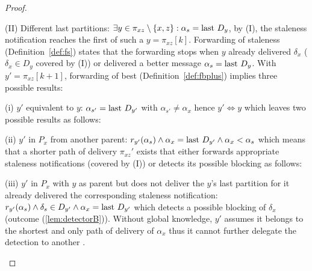 \begin{proof}
\begin{asparadesc}
  \item[(II) Different last partitions:] $\exists y \in \pi_{xz}
    \setminus \{x, z\}: \alpha_s = \textup{last}~ D_y$, by (I), the staleness
    notification reaches the first of such a \process $y =
    \pi_{xz}[k]$.  Forwarding of staleness (Definition~\ref{def:fs})
    states that the forwarding stops when $y$ already delivered
    $\delta_x$ ($\delta_x \in D_y$ covered by (I)) or delivered a
    better message $\alpha_s = \textup{last}~ D_y$.  With $y'=\pi_{xz}[k+1]$,
    forwarding of best (Definition~\ref{def:fbplus}) implies three
    possible results:
  \begin{asparadesc}
  \item [(i) $y'$ equivalent to $y$:] $\alpha_{s'} = \textup{last}~ D_{y'}$
    with $\alpha_{s'} \neq \alpha_x$ hence $y' \iff y$ which leaves
    two possible results as follows:
  \item [(ii) $y'$ in $P_x$ from another parent:] $r_{y'}(\alpha_s)
    \wedge \alpha_x = \textup{last}~ D_{y'} \wedge \alpha_x < \alpha_s$ which
    means that a shorter path of delivery $\pi_{xz}'$ exists that
    either forwards appropriate staleness notifications (covered by
    (I)) or detects its possible blocking as follows:
  \item [(iii) $y'$ in $P_x$ with $y$ as parent] but does not deliver
    the $y$'s last partition for it already delivered the
    corresponding staleness notification: $r_{y'}(\alpha_s) \wedge
    \delta_s \in D_{y'} \wedge \alpha_x = \textup{last}~ D_{y'}$ which detects
    a possible blocking of $\delta_x$ (outcome
    (\ref{lem:detectorB})). Without global knowledge, $y'$ assumes it
    belongs to the shortest and only path of delivery of $\alpha_x$
    thus it cannot further delegate the detection to another \process.
  \end{asparadesc}
  \end{asparadesc}
  \vspace{-1.5em} %

\end{proof}
